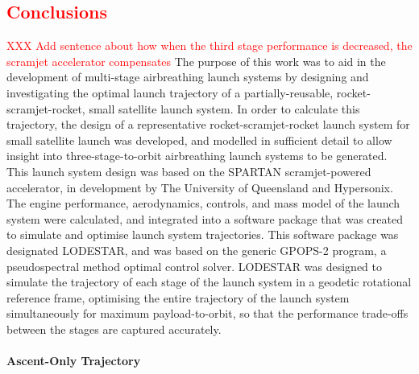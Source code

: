 
\cleardoublepage
\textcolor{red}{
\chapter{Conclusions}
}
\textcolor{red}{XXX Add sentence about how when the third stage performance is decreased, the scramjet accelerator compensates}
\noindent
The purpose of this work was to aid in the development of multi-stage airbreathing launch systems by designing and investigating the optimal launch trajectory of a partially-reusable, rocket-scramjet-rocket, small satellite launch system. 
In order to calculate this trajectory, the design of a representative rocket-scramjet-rocket launch system for small satellite launch was developed, and modelled in sufficient detail to allow insight into three-stage-to-orbit airbreathing launch systems to be generated. This launch system design was based on the SPARTAN scramjet-powered accelerator, in development by The University of Queensland and Hypersonix. The engine performance, aerodynamics, controls, and mass model of the launch system were calculated, and integrated into a software package that was created to simulate and optimise launch system trajectories. This software package was designated LODESTAR, and was based on the generic GPOPS-2 program, a pseudospectral method optimal control solver. LODESTAR was designed to simulate the trajectory of each stage of the launch system in a geodetic rotational reference frame, optimising the entire trajectory of the launch system simultaneously for maximum payload-to-orbit, so that the performance trade-offs between the stages are captured accurately.

\subsubsection{Ascent-Only Trajectory}

